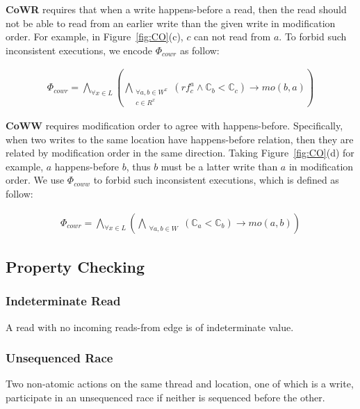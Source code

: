 \documentclass[preprint, numbers, 10pt]{sigplanconf}
\begin{document}
\textbf{CoWR} requires that when a write happens-before a read, then the read should 
not be able to read from an earlier write than the given write in modification order. 
For example, in Figure~\ref{fig:CO}(c),
$c$ can not read from $a$. To forbid such inconsistent executions, we 
encode $\Phi_{cowr}$ as follow: 

\begin{equation}
\begin{aligned}
\Phi_{cowr} = \bigwedge_{\forall x\in L}(\bigwedge_{\substack{\forall a,b\in W^x\\c\in R^x}}
(rf^a_c\wedge\mathbb{C}_b<\mathbb{C}_c)\rightarrow mo(b,a))
\end{aligned}
\end{equation} 

\textbf{CoWW} requires modification order to agree with happens-before. 
Specifically, when two writes to the same location have happens-before relation,
then they are related by modification order in the same direction. 
Taking Figure~\ref{fig:CO}(d) for example, $a$ happens-before $b$, thus $b$ 
must be a latter write than $a$ in modification order. 
We use $\Phi_{coww}$ to forbid such inconsistent executions, which is defined 
as follow: 

\begin{equation}
\begin{aligned}
\Phi_{cowr} = \bigwedge_{\forall x\in L}(\bigwedge_{\substack{\forall a,b\in W}}
(\mathbb{C}_a<\mathbb{C}_b)\rightarrow mo(a,b))
\end{aligned}
\end{equation} 



\subsection{Property Checking}
\label{sec:check}

\subsubsection{Indeterminate Read}

A read with no incoming reads-from edge is of indeterminate value. 

\subsubsection{Unsequenced Race}

Two non-atomic actions on the same thread and location, one of which is 
a write, participate in an unsequenced race if neither is sequenced before the other.
\end{document}
